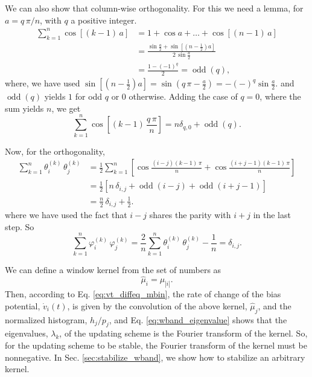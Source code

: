 \documentclass[reprint, floatfix]{revtex4-1}
\begin{document}
{We can also show that column-wise orthogonality.
%
For this we need a lemma, for $a = q \, \pi/n$,
with $q$ a positive integer.
$$
\begin{aligned}
\sum_{k = 1}^n \cos[(k - 1) \, a]
&=
1 + \cos a + \dots + \cos[(n - 1) \, a]
\\
&=
\frac{
      \sin\frac a 2
    + \sin \left[ \left( n - \frac 1 2 \right) a \right]
    }
    {
      2 \, \sin \frac a 2
    }
\\
&=
\frac{ 1 - (-1)^q } { 2 }
= \operatorname{odd}(q),
\end{aligned}
$$
%
where, we have used
$\sin \left[ \left( n - \frac 1 2 \right) a \right]
= \sin \left( q \, \pi - \frac a 2 \right)
= -(-)^q\sin\frac a 2.$
%
and $\operatorname{odd}(q)$
yields $1$ for odd $q$ or $0$ otherwise.
%
Adding the case of $q = 0$, where the sum yields $n$,
we get
$$
\sum_{k = 1}^n \cos\left[(k - 1) \, \frac { q \, \pi } { n }  \right]
= n \delta_{q, 0} + \operatorname{odd}(q).
$$


Now, for the orthogonality,
$$
\begin{aligned}
  \sum_{k = 1}^n
  \theta^{(k)}_i \, \theta^{(k)}_j
  &=
  \frac 1 2
  \sum_{k = 1}^n
  \left[
    \cos \tfrac{ (i - j) (k - 1) \, \pi }
               {         n              }
    +
    \cos \tfrac{ (i + j - 1) (k - 1) \, \pi }
               {             n              }
  \right]
  \\
  &=
  \frac 1 2
  \left[
    n \, \delta_{i, j}
    +
    \operatorname{odd}(i - j)
    +
    \operatorname{odd}(i + j - 1)
  \right]
  \\
  &=
  \frac n 2 \, \delta_{i, j}
  + \frac 1 2.
\end{aligned}
$$
where we have used the fact
that $i - j$ shares the parity with $i + j$
in the last step.
%
So
$$
  \sum_{k = 1}^n
  \varphi^{(k)}_i \, \varphi^{(k)}_j
  =
  \frac 2 n
  \sum_{k = 1}^n
  \theta^{(k)}_i \, \theta^{(k)}_j
  -
  \frac 1 n
  =
  \delta_{i, j}.
$$
}
%



We can define a window kernel from the set of numbers as
$$
\hat \mu_i = \mu_{ |i| }.
$$
Then, according to Eq. \eqref{eq:vt_diffeq_mbin},
the rate of change of the bias potential, $\dot v_i(t)$,
is given by the convolution of the above kernel, $\hat \mu_j$,
and the normalized histogram, $h_j/p_j$\cite{bussi2006},
and Eq. \eqref{eq:wband_eigenvalue}
shows that the eigenvalues, $\lambda_k$, of the updating scheme
is the Fourier transform of the kernel.
%
So, for the updating scheme to be stable,
the Fourier transform of the kernel
must be nonnegative.
%
In Sec. \ref{sec:stabilize_wband},
we show how to stabilize an arbitrary kernel.
\end{document}
